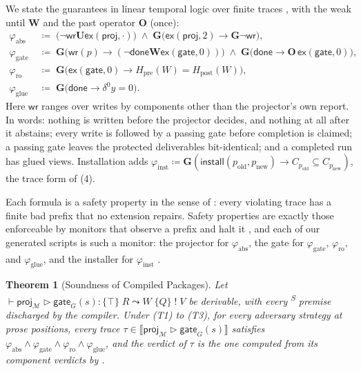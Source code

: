 \documentclass[11pt]{article}
\theoremstyle{definition}
\theoremstyle{plain}
\newtheorem{theorem}{Theorem}
\newcommand{\Mcal}{\mathcal{M}}
\newcommand{\sem}[1]{\llbracket #1 \rrbracket}
\newcommand{\gate}{\mathsf{gate}}
\newcommand{\proj}{\mathsf{proj}}
\newcommand{\ex}{\mathsf{ex}}
\newcommand{\wrt}{\mathsf{wr}}
\newcommand{\done}{\mathsf{done}}
\newcommand{\LTLG}{\mathbf{G}}
\newcommand{\LTLU}{\mathbin{\mathbf{U}}}
\newcommand{\LTLW}{\mathbin{\mathbf{W}}}
\newcommand{\LTLO}{\mathbf{O}}
\newcommand{\hoare}[5]{\vdash #1 : \{#2\}\; #3 \leadsto #4\; \{#5\}}
\newcommand{\checkedS}{\textsuperscript{\textsf{S}}}
\begin{document}
We state the guarantees in linear temporal logic over finite traces \citep{pnueli1977temporal}, with the weak until $\LTLW$ and the past operator $\LTLO$ (once):
\begin{align*}
  \varphi_{\mathrm{abs}} &\;\coloneqq\; \bigl(\lnot \wrt \LTLU \ex(\proj, \cdot)\bigr) \;\land\; \LTLG\bigl(\ex(\proj, 2) \rightarrow \LTLG \lnot \wrt\bigr), \\
  \varphi_{\mathrm{gate}} &\;\coloneqq\; \LTLG\bigl(\wrt(p) \rightarrow (\lnot \done \LTLW \ex(\gate, 0))\bigr) \;\land\; \LTLG\bigl(\done \rightarrow \LTLO\, \ex(\gate, 0)\bigr), \\
  \varphi_{\mathrm{ro}} &\;\coloneqq\; \LTLG\bigl(\ex(\gate, 0) \rightarrow H_{\mathrm{pre}}(W) = H_{\mathrm{post}}(W)\bigr), \\
  \varphi_{\mathrm{glue}} &\;\coloneqq\; \LTLG\bigl(\done \rightarrow \delta^0 y = 0\bigr).
\end{align*}
Here $\wrt$ ranges over writes by components other than the projector's own report. In words: nothing is written before the projector decides, and nothing at all after it abstains; every write is followed by a passing gate before completion is claimed; a passing gate leaves the protected deliverables bit-identical; and a completed run has glued views. Installation adds $\varphi_{\mathrm{inst}} \coloneqq \LTLG(\mathsf{install}(p_{\mathrm{old}}, p_{\mathrm{new}}) \rightarrow C_{p_{\mathrm{old}}} \subseteq C_{p_{\mathrm{new}}})$, the trace form of (4).

Each formula is a safety property in the sense of \citet{alpern1985defining}: every violating trace has a finite bad prefix that no extension repairs. Safety properties are exactly those enforceable by monitors that observe a prefix and halt it \citep{schneider2000enforceable}, and each of our generated scripts is such a monitor: the projector for $\varphi_{\mathrm{abs}}$, the gate for $\varphi_{\mathrm{gate}}$, $\varphi_{\mathrm{ro}}$, and $\varphi_{\mathrm{glue}}$, and the installer for $\varphi_{\mathrm{inst}}$ \citep{leucker2009brief}.

\begin{theorem}[Soundness of Compiled Packages]
\label{thm:soundness}
Let $\hoare{\proj_{\Mcal} \triangleright \gate_G(s)}{\top}{R}{W}{Q} \;!\; V$ be derivable, with every \checkedS{} premise discharged by the compiler. Under (T1) to (T3), for every adversary strategy at prose positions, every trace $\tau \in \sem{\proj_{\Mcal} \triangleright \gate_G(s)}$ satisfies $\varphi_{\mathrm{abs}} \land \varphi_{\mathrm{gate}} \land \varphi_{\mathrm{ro}} \land \varphi_{\mathrm{glue}}$, and the verdict of $\tau$ is the one computed from its component verdicts by .
\end{theorem}
\end{document}
